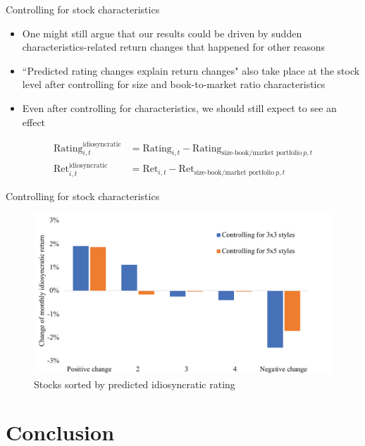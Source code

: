 \documentclass[UTF8, 16pt]{beamer}
\begin{document}
\begin{CJK*}{UTF8}{gbsn}
\begin{frame}{Controlling for stock characteristics}
	\begin{itemize}
		\item One might still argue that our results could be driven by sudden characteristics-related return changes that happened for other reasons
		\item \alert{``Predicted rating changes explain return changes"} also take place at the stock level after controlling for size and book-to-market ratio characteristics
		\item Even after controlling for characteristics, we should still expect to see an effect
	\end{itemize}
	
	$$
	\begin{aligned} 
	\mathrm{Rating }_{i, t}^{\text{idiosyncratic}} & =\mathrm{Rating}_{i, t}-\mathrm{Rating}_{\text{size-book/market portfolio}\ p, t}
	 \\
	  \mathrm{Ret}_{i, t}^{\text{idiosyncratic}} & =\mathrm{Ret}_{i, t}-\mathrm{Ret}_{\text {size-book/market portfolio}\ p, t}
	\end{aligned}
	$$
\end{frame}

\begin{frame}{Controlling for stock characteristics}
	\begin{figure}[htpb]
	  \begin{center}
	    \includegraphics[width=1  \linewidth]
	    {pic/control.png}
	  \end{center}
	  \caption{Stocks sorted by predicted idiosyncratic rating}
	\end{figure}
\end{frame}

\section{Conclusion}


\end{CJK*}
\end{document}
